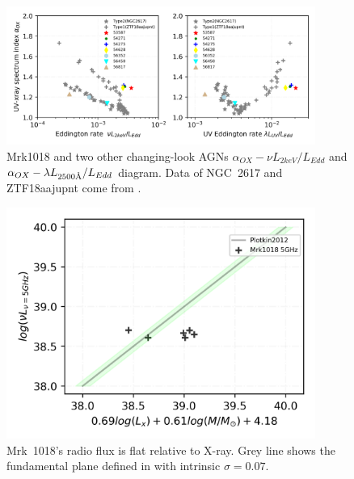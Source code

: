 \documentclass[twocolumn]{aastex63}
\newcommand{\angstrom}{\text{\normalfont\AA}}
\begin{document}
\begin{figure}
\centering
	\includegraphics[width=0.9\textwidth]{./pic/Mrk1018_subplots_plus_2individuals_alpha_ox_L_x_Luv_rate.png}
    \caption{Mrk1018 and two other changing-look AGNs $\alpha_{OX}-\nu L_{2keV}/L_{Edd}$ and $\alpha_{OX}-\lambda L_{2500 \angstrom}/L_{Edd}$ diagram. Data of NGC~2617 and ZTF18aajupnt come from \citet{2019arXiv190904676R}.  }
    \label{fig:alpha_ox_luv}
\end{figure}



\begin{figure}
\centering
	\includegraphics[width=0.9\textwidth]{./pic/Mrk1018_radio_xray_Plotkin2012.png}
    \caption{Mrk~1018's radio flux is flat relative to X-ray. Grey line shows the fundamental plane defined in \citet{2012MNRAS.419..267P} with intrinsic $\sigma=0.07$.}
    \label{fig:radio-xray-mass_relation_Plotkin2012}
\end{figure}
\end{document}
